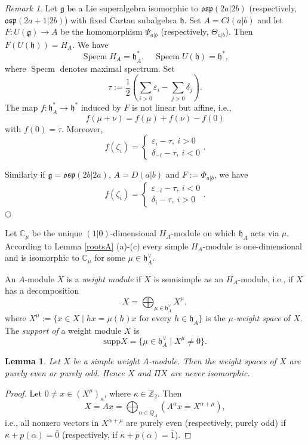 \documentclass[12pt]{amsart}
\makeatletter
\def\@putname#1#2#3#4{\def\@@ref{#3}\let\old@bf\bf
        \def\bf##1{\old@bf\if?\noexpand##1?{#4}\else##1\fi}%
	#1{#2}%
        \let\bf\old@bf}
\def\@putname#1#2#3#4{\def\@@ref{#3}\let\old@bf\bf	%
	\let\old@reset@font\reset@font			%
        \def\bf##1{\old@bf\if?\noexpand##1?{#4}\else##1\fi}%
	\def\reset@font##1##2{\old@reset@font##1\if?\noexpand##2?{#4}\else##2\fi}#1{#2}%
        \let\bf\old@bf\let\reset@font\old@reset@font}
\let\my@ref=\ref
\def\ref#1{\@putname\my@ref{#1}{#1}{\tiny\rm\@@ref}}
\theoremstyle{plain} %
\numberwithin{equation}{section}
\theoremstyle{definition}
\theoremstyle{remark}
\newtheorem{remark}[definition]{Remark} %
\theoremstyle{plain} %
\newtheorem{lemma}[definition]{Lemma}
\renewcommand{\gg}{\mathfrak{g}}
\newcommand{\CC}{\mathbb{C}}
\newcommand{\supp}{\mathrm{supp}}
\newcommand{\gh}{\mathfrak{h}}
\def\gg{\mathfrak{g}}
\def\gh{\mathfrak{h}}
\makeatother
\begin{document}
\begin{remark}\label{weightcorrespondence} Let $\gg$ be a Lie superalgebra isomorphic to $\mathfrak{osp}(2a|2b)$ (respectively,
       $\mathfrak{osp}(2a+1|2b)$) with fixed Cartan subalgebra $\gh$. Set $A=Cl(a|b)$ and let $F:U(\gg)\to A$ be the homomorphism $\Psi_{a|b}$ (respectively, $\Theta_{a|b}$).  Then $F(U(\gh))=H_A$. We have
       $$\operatorname{Specm}H_A=\gh^*_A,\quad \operatorname{Specm}U(\gh)=\gh^*, $$
       where $\operatorname{Specm}$ denotes  maximal spectrum. Set
       $$\tau:=\frac{1}{2}(\sum_{i>0}\varepsilon_i-\sum_{j>0}\delta_{j}).$$ The map $f:\gh_A^*\to \gh^*$ induced by $F$ is not linear but affine, i.e.,
$$f(\mu+\nu)=f(\mu)+f(\nu)-f(0)$$
       with $f(0)=\tau$. Moreover,
       $$f(\zeta_i)=\begin{cases} \varepsilon_i-\tau,\ i>0 \\ \delta_{-i}-\tau,\ i<0 \end{cases}.$$


       Similarly if $\gg=\mathfrak{osp}(2b|2a)$, $A=D(a|b)$ and $F:=\Phi_{a|b}$, we have
               $$f(\zeta_i)=\begin{cases} \varepsilon_{-i}-\tau,\ i<0 \\ \delta_{i}-\tau,\ i>0 \end{cases}.$$
       \hfill${\bigcirc}$
     \end{remark}



Let $\CC_\mu$ be the unique $(1|0)$-dimensional $H_A$-module on which $\gh_A$ acts via $\mu$.  According to Lemma \ref{rootsA}(a)-(c) every simple $H_A$-module is one-dimensional and is isomorphic to $\CC_{\mu}$ for some $\mu\in \gh^{\vee}_A$. 
        
                An $A$-module $X$ is a \emph{weight module} if $X$ is semisimple as an $H_A$-module, i.e., if $X$ has a  decomposition
        $$X=\bigoplus_{\mu\in \gh^{\vee}_A} X^\mu,$$
        where $X^{\mu} := \{ x \in X \; | \; hx=\mu(h)x \mbox{ for every }h \in \mathfrak h_A\}$ is the \emph{$\mu$-weight space} of $X$. The \emph{support of} a weight module $X$ is  
        $$ \supp  X = \{\mu \in \gh^{\vee}_A \; | \; X^{\mu} \neq 0 \}. $$


         
\begin{lemma}\label{pure}
Let $X$ be a simple weight $A$-module. Then the weight spaces of $X$ are purely even or purely odd. Hence $X$ and $\Pi X$ are never isomorphic.
\end{lemma}
\begin{proof}   Let $0 \neq x\in (X^\mu)_{{\kappa}}$, where ${\kappa} \in \mathbb Z_2 $. Then
  $$X=Ax=\bigoplus_{\alpha\in Q_A} (A^\alpha x = X^{\alpha + \mu}),$$
  i.e., all nonzero vectors in $X^{\alpha + \mu}$ are purely even (respectively, purely odd) if ${\kappa} + p(\alpha) = \bar{0}$ (respectively, if ${\kappa} + p(\alpha) = \bar{1}$).
    \end{proof}
\end{document}
